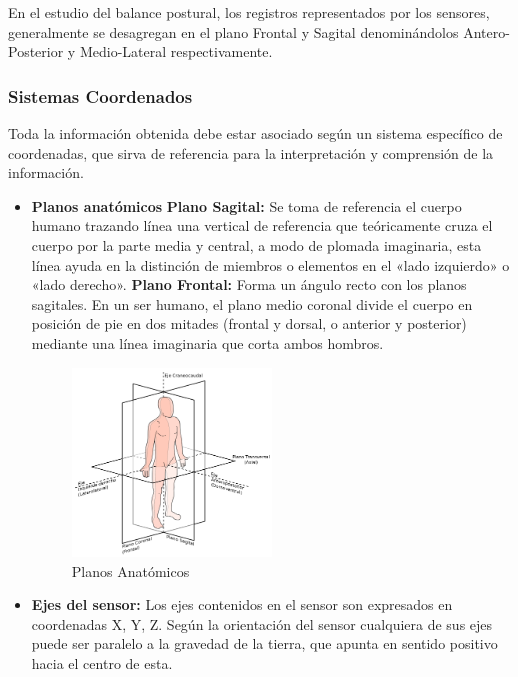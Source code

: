 \documentclass[12pt,a4paper]{article}
\begin{document}
En el estudio del balance postural, los registros representados por los sensores, generalmente se desagregan en el plano Frontal y Sagital denominándolos Antero-Posterior y Medio-Lateral respectivamente. 

\subsubsection{Sistemas Coordenados}

Toda la información obtenida debe estar asociado según un sistema específico de coordenadas, que sirva de referencia para la interpretación y comprensión de la información.

\begin{itemize}
	
	\item \textbf{Planos anatómicos} 
	\subitem \textbf{Plano Sagital:}
	Se toma de referencia el cuerpo humano trazando línea una  vertical de referencia que teóricamente cruza el cuerpo por la parte media y central, a modo de plomada imaginaria, esta línea ayuda en la distinción de miembros o elementos en el «lado izquierdo» o «lado derecho».
	\subitem \textbf{Plano Frontal:} Forma un ángulo recto con los planos sagitales. En un ser humano, el plano medio coronal divide el cuerpo en posición de pie en dos mitades (frontal y dorsal, o anterior y posterior) mediante una línea imaginaria que corta ambos hombros.
	
	\begin{figure}[H]
		\centering
		\includegraphics[width=0.5\textwidth]{images/planosAnatomicos}
		\caption{Planos Anatómicos}
		\label{fig:sagital}
	\end{figure}
	
	\item \textbf{Ejes del sensor:} Los ejes contenidos en el sensor son expresados en coordenadas X, Y, Z.
	Según la orientación del sensor cualquiera de sus ejes puede ser paralelo a la gravedad de la tierra, que apunta en sentido positivo hacia el centro de esta.
\end{itemize}
\end{document}

